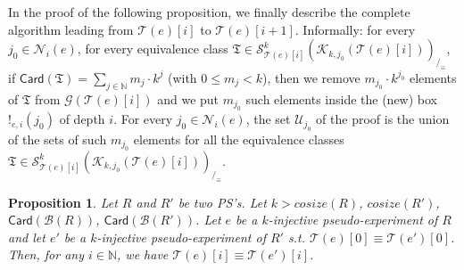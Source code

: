 \documentclass{article}
\theoremstyle{plain}
\newtheorem{prop}[theorem]{Proposition}
\newcommand{\Nat}{\ensuremath{\mathbb{N}}}
\newcommand{\nontrivialconnected}[3]{\mathcal{S}_{#1}^{#3}(#2)}
\newcommand{\taylor}[2]{\mathcal{T}(#1)[#2]}
\newcommand{\criticalports}[3]{\mathcal{K}_{#2, #3}(#1)}
\newcommand{\groundof}[1]{\mathcal{G}(#1)}
\newcommand{\cosize}[1]{\textit{cosize}(#1)}
\newcommand{\Card}[1]{\textsf{Card}\left( #1 \right)}
\newcommand{\boxes}[1]{\mathcal{B}(#1)}
\begin{document}
In the proof of the following proposition, we finally describe the complete algorithm leading from $\taylor{e}{i}$ to $\taylor{e}{i+1}$.
 Informally: for every $j_0 \in \mathcal{N}_i(e)$, for every equivalence class $\mathfrak{T} \in \nontrivialconnected{\taylor{e}{i}}{\criticalports{\taylor{e}{i}}{k}{j_0}}{k}_{/_\equiv}$, if $\Card{\mathfrak{T}} = \sum_{j \in \Nat} m_j \cdot k^j$ (with $0 \leq m_j <k$), then we remove $m_{j_0} \cdot k^{j_0}$ elements of $\mathfrak{T}$ from $\groundof{\taylor{e}{i}}$ and we put $m_{j_0}$ such elements inside the (new) box $!_{e, i}(j_0)$ of depth $i$. For every $j_0 \in \mathcal{N}_i(e)$, the set $\mathcal{U}_{j_0}$ of the proof is the union of the sets of such $m_{j_0}$ elements for all the equivalence classes $\mathfrak{T} \in \nontrivialconnected{\taylor{e}{i}}{\criticalports{\taylor{e}{i}}{k}{j_0}}{k}_{/_\equiv}$.


\begin{prop}\label{prop: from i to i+1}
Let $R$ and $R'$ be two PS's. Let $k > \cosize{R}$, $\cosize{R'}$, $\Card{\boxes{R}}$, $\Card{\boxes{R'}}$. Let $e$ be a $k$-injective pseudo-experiment of $R$ and let $e'$ be a $k$-injective pseudo-experiment of $R'$ s.t. $\taylor{e}{0} \equiv \taylor{e'}{0}$. Then, for any $i \in \Nat$, we have $\taylor{e}{i} \equiv \taylor{e'}{i}$.
\end{prop}
\end{document}
